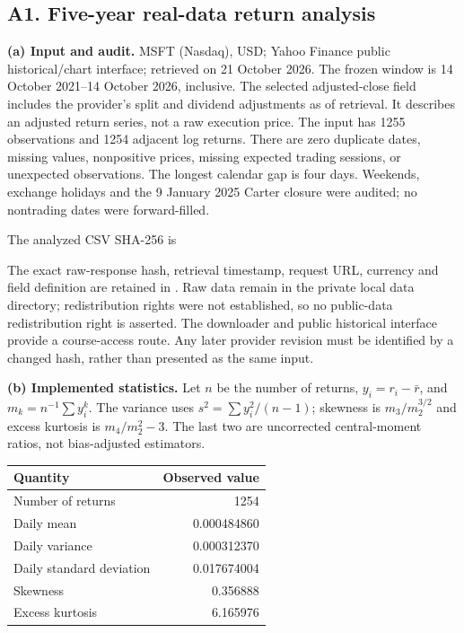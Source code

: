 \subsection{A1. Five-year real-data return analysis}
\textbf{(a) Input and audit.} MSFT (Nasdaq), USD; Yahoo Finance public historical/chart interface; retrieved on 21 October 2026. The frozen window is 14 October 2021--14 October 2026, inclusive. The selected adjusted-close field includes the provider's split and dividend adjustments as of retrieval. It describes an adjusted return series, not a raw execution price. The input has 1255 observations and 1254 adjacent log returns. There are zero duplicate dates, missing values, nonpositive prices, missing expected trading sessions, or unexpected observations. The longest calendar gap is four days. Weekends, exchange holidays and the 9 January 2025 Carter closure were audited; no nontrading dates were forward-filled.

The analyzed CSV SHA-256 is
\begin{quote}\small{}\end{quote}
The exact raw-response hash, retrieval timestamp, request URL, currency and field definition are retained in . Raw data remain in the private local data directory; redistribution rights were not established, so no public-data redistribution right is asserted. The downloader and public historical interface provide a course-access route. Any later provider revision must be identified by a changed hash, rather than presented as the same input.

\textbf{(b) Implemented statistics.} Let $n$ be the number of returns, $y_i=r_i-\bar r$, and $m_k=n^{-1}\sum y_i^k$. The variance uses $s^2=\sum y_i^2/(n-1)$; skewness is $m_3/m_2^{3/2}$ and excess kurtosis is $m_4/m_2^2-3$. The last two are uncorrected central-moment ratios, not bias-adjusted estimators.
\begin{center}
\begin{tabular}{lr}
\toprule
Quantity & Observed value\\\midrule
Number of returns & 1254\\
Daily mean & 0.000484860\\
Daily variance & 0.000312370\\
Daily standard deviation & 0.017674004\\
Skewness & 0.356888\\
Excess kurtosis & 6.165976\\
\bottomrule
\end{tabular}
\end{center}

